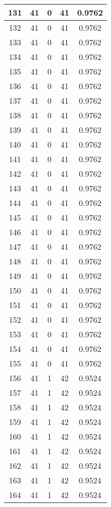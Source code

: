 \documentclass[letterpaper, 12pt]{article}
\begin{document}
\begin{longtable}{|c|c|c|c|c|}
\hline
131 & 41 & 0 & 41 & 0.9762 \\
\hline
132 & 41 & 0 & 41 & 0.9762 \\
\hline
133 & 41 & 0 & 41 & 0.9762 \\
\hline
134 & 41 & 0 & 41 & 0.9762 \\
\hline
135 & 41 & 0 & 41 & 0.9762 \\
\hline
136 & 41 & 0 & 41 & 0.9762 \\
\hline
137 & 41 & 0 & 41 & 0.9762 \\
\hline
138 & 41 & 0 & 41 & 0.9762 \\
\hline
139 & 41 & 0 & 41 & 0.9762 \\
\hline
140 & 41 & 0 & 41 & 0.9762 \\
\hline
141 & 41 & 0 & 41 & 0.9762 \\
\hline
142 & 41 & 0 & 41 & 0.9762 \\
\hline
143 & 41 & 0 & 41 & 0.9762 \\
\hline
144 & 41 & 0 & 41 & 0.9762 \\
\hline
145 & 41 & 0 & 41 & 0.9762 \\
\hline
146 & 41 & 0 & 41 & 0.9762 \\
\hline
147 & 41 & 0 & 41 & 0.9762 \\
\hline
148 & 41 & 0 & 41 & 0.9762 \\
\hline
149 & 41 & 0 & 41 & 0.9762 \\
\hline
150 & 41 & 0 & 41 & 0.9762 \\
\hline
151 & 41 & 0 & 41 & 0.9762 \\
\hline
152 & 41 & 0 & 41 & 0.9762 \\
\hline
153 & 41 & 0 & 41 & 0.9762 \\
\hline
154 & 41 & 0 & 41 & 0.9762 \\
\hline
155 & 41 & 0 & 41 & 0.9762 \\
\hline
156 & 41 & 1 & 42 & 0.9524 \\
\hline
157 & 41 & 1 & 42 & 0.9524 \\
\hline
158 & 41 & 1 & 42 & 0.9524 \\
\hline
159 & 41 & 1 & 42 & 0.9524 \\
\hline
160 & 41 & 1 & 42 & 0.9524 \\
\hline
161 & 41 & 1 & 42 & 0.9524 \\
\hline
162 & 41 & 1 & 42 & 0.9524 \\
\hline
163 & 41 & 1 & 42 & 0.9524 \\
\hline
164 & 41 & 1 & 42 & 0.9524 \\

\end{longtable}
\end{document}
